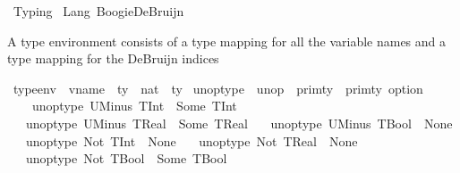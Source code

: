 %
\begin{isabellebody}%
%
%
\isadelimdocument
%
\endisadelimdocument
%
\isatagdocument
%
\isamarkuptrue%
%
\endisatagdocument
{\isafolddocument}%
%
\isadelimdocument
%
\endisadelimdocument
%
\isadelimtheory
%
\endisadelimtheory
%
\isatagtheory
{}\isamarkupfalse%
\ Typing\isanewline
{}\ Lang\ BoogieDeBruijn\isanewline
{}%
\endisatagtheory
{\isafoldtheory}%
%
\isadelimtheory
%
\endisadelimtheory
%
\begin{isamarkuptext}%
A type environment consists of a type mapping for all the variable names and a type mapping for
the DeBruijn indices%
\end{isamarkuptext}\isamarkuptrue%
\isamarkupfalse%
\ type{\isacharunderscore}{\kern0pt}env\ {\isacharequal}{\kern0pt}\ {\isachardoublequoteopen}{\isacharparenleft}{\kern0pt}vname\ {\isasymrightharpoonup}\ ty{\isacharparenright}{\kern0pt}\ {\isasymtimes}\ {\isacharparenleft}{\kern0pt}nat\ {\isasymrightharpoonup}\ ty{\isacharparenright}{\kern0pt}{\isachardoublequoteclose}\isanewline
\isanewline
{}\isamarkupfalse%
\ unop{\isacharunderscore}{\kern0pt}type\ {\isacharcolon}{\kern0pt}{\isacharcolon}{\kern0pt}\ {\isachardoublequoteopen}unop\ {\isasymRightarrow}\ prim{\isacharunderscore}{\kern0pt}ty\ {\isasymRightarrow}\ prim{\isacharunderscore}{\kern0pt}ty\ option{\isachardoublequoteclose}\isanewline
\ \ \ \isanewline
\ \ \ \ {\isachardoublequoteopen}unop{\isacharunderscore}{\kern0pt}type\ UMinus\ TInt\ {\isacharequal}{\kern0pt}\ Some\ TInt{\isachardoublequoteclose}\isanewline
\ \ {\isacharbar}{\kern0pt}\ {\isachardoublequoteopen}unop{\isacharunderscore}{\kern0pt}type\ UMinus\ TReal\ {\isacharequal}{\kern0pt}\ Some\ TReal{\isachardoublequoteclose}\isanewline
\ \ {\isacharbar}{\kern0pt}\ {\isachardoublequoteopen}unop{\isacharunderscore}{\kern0pt}type\ UMinus\ TBool\ {\isacharequal}{\kern0pt}\ None{\isachardoublequoteclose}\isanewline
\ \ {\isacharbar}{\kern0pt}\ {\isachardoublequoteopen}unop{\isacharunderscore}{\kern0pt}type\ Not\ TInt\ {\isacharequal}{\kern0pt}\ None{\isachardoublequoteclose}\isanewline
\ \ {\isacharbar}{\kern0pt}\ {\isachardoublequoteopen}unop{\isacharunderscore}{\kern0pt}type\ Not\ TReal\ {\isacharequal}{\kern0pt}\ None{\isachardoublequoteclose}\isanewline
\ \ {\isacharbar}{\kern0pt}\ {\isachardoublequoteopen}unop{\isacharunderscore}{\kern0pt}type\ Not\ TBool\ {\isacharequal}{\kern0pt}\ Some\ TBool{\isachardoublequoteclose}\isanewline

\end{isabellebody}
